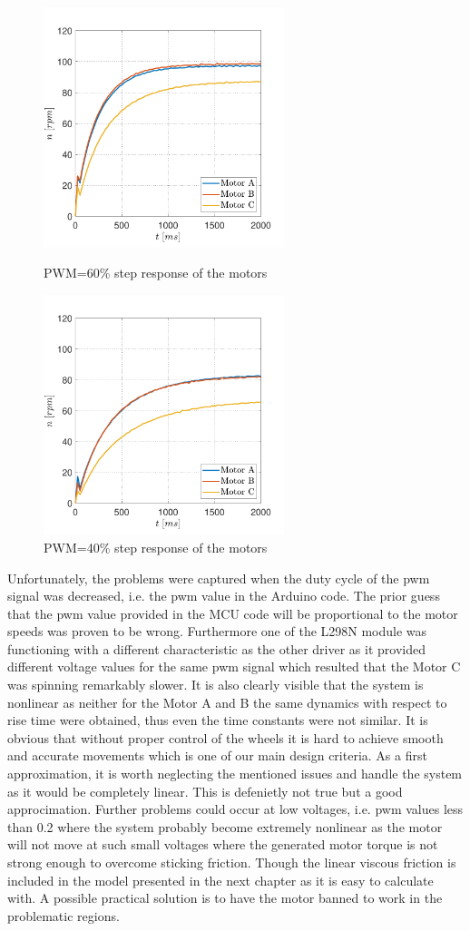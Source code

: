 \documentclass[12pt,english]{article}
\begin{document}
\begin{figure}[htb!]
	\centering
	\centering
	\includegraphics[height=7cm]{figures/directed_speed_pwm_60}
	\caption{PWM=60\% step response of the motors}
	\endminipage\hfill
	\centering
	\includegraphics[height=7cm]{figures/directed_speed_pwm_40}
	\caption{PWM=40\% step response of the motors}
	\label{mecanum}
	\endminipage\hfill
\end{figure}
Unfortunately, the problems were captured when the duty cycle of the pwm signal was decreased, i.e. the pwm value in the Arduino code. The prior guess that the pwm value provided in the MCU code will be proportional to the motor speeds was proven to be wrong. Furthermore one of the L298N module was functioning with a different characteristic as the other driver as it provided different voltage values for the same pwm signal which resulted that the Motor C was spinning remarkably slower. It is also clearly visible that the system is nonlinear as neither for the Motor A and B the same dynamics with respect to rise time were obtained, thus even the time constants were not similar.
It is obvious that without proper control of the wheels it is hard to achieve smooth and accurate movements which is one of our main design criteria. As a first approximation, it is worth neglecting the mentioned issues and handle the system as it would be completely linear. This is defenietly not true but a good approcimation. Further problems could occur at low voltages, i.e. pwm values less than 0.2 where the system probably become extremely nonlinear as the motor will not move at such small voltages where the generated motor torque is not strong enough to overcome sticking friction. Though the linear viscous friction is included in the model presented in the next chapter as it is easy to calculate with. A possible practical solution is to have the motor banned to work in the problematic regions. 
\end{document}
